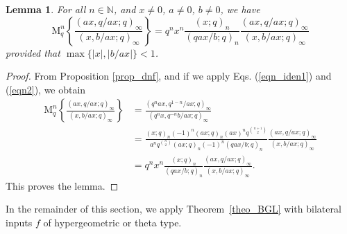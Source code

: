 \documentclass[12pt]{article}
\newcommand{\N}{\mathbb{N}}
\newcommand{\M}{\mathrm{M}}
\newtheorem{lemma}{Lemma}
\begin{document}
\begin{lemma}\label{lemma2}
For all $n\in\N$, and $x\neq0$, $a\neq0$, $b\neq0$, we have
    \begin{equation}
        \M_{q}^n\left\{\frac{(ax,q/ax;q)_{\infty}}{(x,b/ax;q)_{\infty}}\right\}=q^nx^n\frac{(x;q)_{n}}{(qax/b;q)_{n}}\frac{(ax,q/ax;q)_{\infty}}{(x,b/ax;q)_{\infty}}
    \end{equation}
provided that $\max\{\vert x\vert,\vert b/ax\vert\}<1$.    
\end{lemma}
\begin{proof}
From Proposition \ref{prop_dnf}, and if we apply Eqs. (\ref{eqn_iden1}) and (\ref{eqn2}), we obtain
    \begin{align*}
        \M_{q}^n\left\{\frac{(ax,q/ax;q)_{\infty}}{(x,b/ax;q)_{\infty}}\right\}&=\frac{(q^nax,q^{1-n}/ax;q)_{\infty}}{(q^nx,q^{-n}b/ax;q)_{\infty}}\\
        &=\frac{(x;q)_{n}(-1)^n(ax;q)_{n}(ax)^nq^{\binom{n+1}{2}}}{a^nq^{\binom{n}{2}}(ax;q)_{n}(-1)^n(qax/b;q)_{n}}\frac{(ax,q/ax;q)_{\infty}}{(x,b/ax;q)_{\infty}}\\
        &=q^nx^n\frac{(x;q)_{n}}{(qax/b;q)_{n}}\frac{(ax,q/ax;q)_{\infty}}{(x,b/ax;q)_{\infty}}.
    \end{align*}
This proves the lemma.
\end{proof}

In the remainder of this section, we apply Theorem~\ref{theo_BGL} with
bilateral inputs \(f\) of hypergeometric or theta type.
\end{document}
